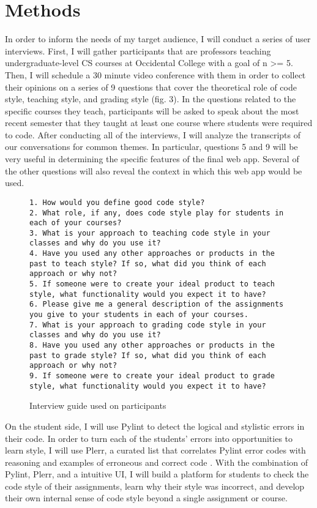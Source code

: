 \documentclass[10pt,twocolumn]{article}
\begin{document}
\section{Methods}
In order to inform the needs of my target audience, I will conduct a series of user interviews. First, I will gather participants that are professors teaching undergraduate-level CS courses at Occidental College with a goal of n >= 5. Then, I will schedule a 30 minute video conference with them in order to collect their opinions on a series of 9 questions that cover the theoretical role of code style, teaching style, and grading style (fig. 3). In the questions related to the specific courses they teach, participants will be asked to speak about the most recent semester that they taught at least one course where students were required to code. After conducting all of the interviews, I will analyze the transcripts of our conversations for common themes. In particular, questions 5 and 9 will be very useful in determining the specific features of the final web app. Several of the other questions will also reveal the context in which this web app would be used.

\begin{figure}
\begin{lstlisting}
1. How would you define good code style?
2. What role, if any, does code style play for students in each of your courses?
3. What is your approach to teaching code style in your classes and why do you use it?
4. Have you used any other approaches or products in the past to teach style? If so, what did you think of each approach or why not?
5. If someone were to create your ideal product to teach style, what functionality would you expect it to have?
6. Please give me a general description of the assignments you give to your students in each of your courses.
7. What is your approach to grading code style in your classes and why do you use it?
8. Have you used any other approaches or products in the past to grade style? If so, what did you think of each approach or why not?
9. If someone were to create your ideal product to grade style, what functionality would you expect it to have?
\end{lstlisting}
    \vspace{7 mm}
	\centering
	\caption{Interview guide used on participants}
\end{figure}

On the student side, I will use Pylint to detect the logical and stylistic errors in their code. In order to turn each of the students’ errors into opportunities to learn style, I will use Plerr, a curated list that correlates Pylint error codes with reasoning and examples of erroneous and correct code \cite{plerr}. With the combination of Pylint, Plerr, and a intuitive UI, I will build a platform for students to check the code style of their assignments, learn why their style was incorrect, and develop their own internal sense of code style beyond a single assignment or course.
\end{document}
